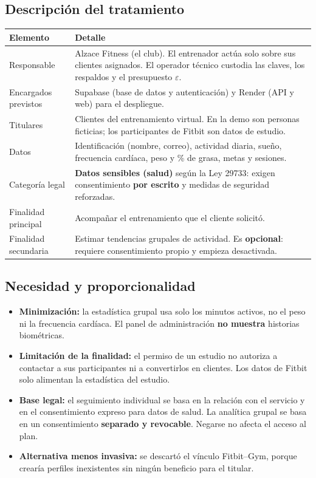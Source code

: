 \documentclass[11pt]{article}
\begin{document}
\subsection{Descripción del tratamiento}
\begin{table}[H]
\centering\small
\begin{tabularx}{\textwidth}{@{}p{3.3cm}Y@{}}
\toprule
\textbf{Elemento} & \textbf{Detalle} \\
\midrule
Responsable & Alzace Fitness (el club). El entrenador actúa solo sobre sus clientes asignados. El operador técnico custodia las claves, los respaldos y el presupuesto $\varepsilon$. \\
Encargados previstos & Supabase (base de datos y autenticación) y Render (API y web) para el despliegue. \\
Titulares & Clientes del entrenamiento virtual. En la demo son personas ficticias; los participantes de Fitbit son datos de estudio. \\
Datos & Identificación (nombre, correo), actividad diaria, sueño, frecuencia cardíaca, peso y \% de grasa, metas y sesiones. \\
Categoría legal & \textbf{Datos sensibles (salud)} según la Ley 29733: exigen consentimiento \textbf{por escrito} y medidas de seguridad reforzadas. \\
Finalidad principal & Acompañar el entrenamiento que el cliente solicitó. \\
Finalidad secundaria & Estimar tendencias grupales de actividad. Es \textbf{opcional}: requiere consentimiento propio y empieza desactivada. \\
\bottomrule
\end{tabularx}
\end{table}

\subsection{Necesidad y proporcionalidad}
\begin{itemize}[nosep]
  \item \textbf{Minimización:} la estadística grupal usa solo los minutos activos, no el peso ni la frecuencia cardíaca. El panel de administración \textbf{no muestra} historias biométricas.
  \item \textbf{Limitación de la finalidad:} el permiso de un estudio no autoriza a contactar a sus participantes ni a convertirlos en clientes. Los datos de Fitbit solo alimentan la estadística del estudio.
  \item \textbf{Base legal:} el seguimiento individual se basa en la relación con el servicio y en el consentimiento expreso para datos de salud. La analítica grupal se basa en un consentimiento \textbf{separado y revocable}. Negarse no afecta el acceso al plan.
  \item \textbf{Alternativa menos invasiva:} se descartó el vínculo Fitbit--Gym, porque crearía perfiles inexistentes sin ningún beneficio para el titular.
\end{itemize}
\end{document}
